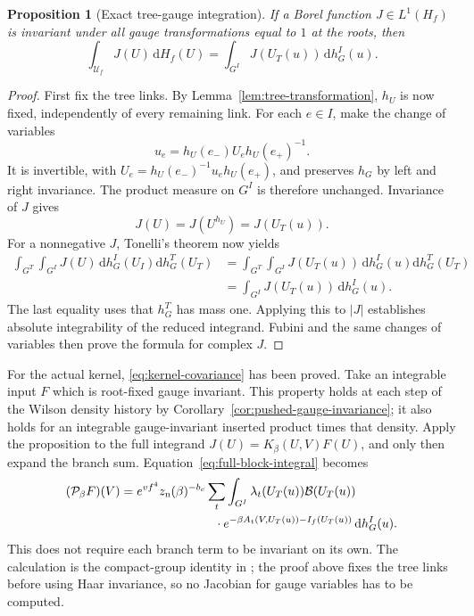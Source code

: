 \documentclass[11pt,reqno]{amsart}
\numberwithin{equation}{section}
\newtheorem{proposition}[theorem]{Proposition}
\theoremstyle{definition}
\theoremstyle{remark}
\newcommand{\dd}{\mathrm d}
\begin{document}
\begin{proposition}[Exact tree-gauge integration]
\label{prop:tree-integration}
If a Borel function \(J\in L^1(H_f)\) is invariant under all gauge
transformations equal to \(1\) at the roots, then
\begin{equation}
        \int_{\mathcal U_f}J(U)\,\dd H_f(U)
          =\int_{G^I}J(U_T(u))\,\dd h_G^I(u).
 \label{eq:tree-integration}
\end{equation}
\end{proposition}
\begin{proof}
First fix the tree links. By Lemma~\ref{lem:tree-transformation},
\(h_U\) is now fixed, independently of every remaining link.
For each \(e\in I\), make the change of variables
\begin{equation}
                 u_e=h_U(e_-)U_eh_U(e_+)^{-1}.
 \label{eq:free-link-change}
\end{equation}
It is invertible, with
\(U_e=h_U(e_-)^{-1}u_eh_U(e_+)\), and preserves \(h_G\) by
left and right invariance. The product measure on \(G^I\) is
therefore unchanged. Invariance of \(J\) gives
\[
                         J(U)=J(U^{h_U})=J(U_T(u)).
\]
For a nonnegative \(J\), Tonelli's theorem now yields
\begin{align*}
 \int_{G^T}\int_{G^I}J(U)\,\dd h_G^I(U_I)\dd h_G^T(U_T)
 &=\int_{G^T}\int_{G^I}J(U_T(u))\,\dd h_G^I(u)\dd h_G^T(U_T)\\
 &=\int_{G^I}J(U_T(u))\,\dd h_G^I(u).
\end{align*}
The last equality uses that \(h_G^T\) has mass one. Applying this
to \(|J|\) establishes absolute integrability of the reduced
integrand. Fubini and the same changes of variables then prove the
formula for complex \(J\).
\end{proof}

For the actual kernel, \eqref{eq:kernel-covariance} has been proved.
Take an integrable input \(F\) which is root-fixed gauge invariant.
This property holds at each step of the Wilson density history by
Corollary~\ref{cor:pushed-gauge-invariance}; it also holds for an
integrable gauge-invariant inserted product times that density.
Apply the proposition to the full
integrand \(J(U)=K_\beta(U,V)F(U)\), and only then expand the
branch sum. Equation~\eqref{eq:full-block-integral} becomes
\begin{equation}
 \begin{split}
 (\mathcal P_\beta F)(V)
 ={}&e^{vf^4}z_{\mathrm n}(\beta)^{-b_c}
       \sum_t\int_{G^I}\lambda_t(U_T(u))\mathcal B(U_T(u))\\
 &\hspace{22mm}\cdot
       e^{-\beta A_t(V,U_T(u))-I_f(U_T(u))}\,\dd h_G^I(u).
 \end{split}
 \label{eq:tree-block-integral}
\end{equation}
This does not require each branch term to be invariant on its own.
The calculation is the compact-group identity in
\cite[Lemma~11.2 and (11.5), p.~37]{Main}; the proof above fixes the
tree links before using Haar invariance, so no Jacobian for gauge
variables has to be computed.
\end{document}
